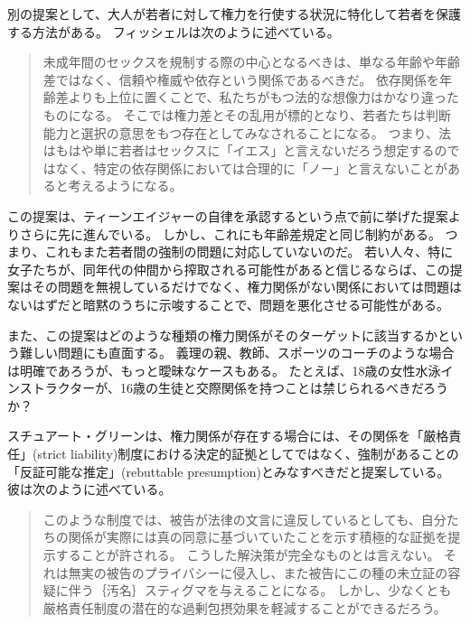 \documentclass[paper=a4,book,openany]{jlreq}
\newcommand{\ig}[1]{}           %
\begin{document}
別の提案として、大人が若者に対して権力を行使する状況に特化して若者を保護する方法がある。
フィッシェルは次のように述べている。

\begin{quote}
未成年間のセックスを規制する際の中心となるべきは、単なる年齢や年齢差ではなく、信頼や権威や依存という関係であるべきだ。
依存関係を年齢差よりも上位に置くことで、私たちがもつ法的な想像力はかなり違ったものになる。
そこでは権力差とその乱用が標的となり、若者たちは判断能力と選択の意思をもつ存在としてみなされることになる。
つまり、法はもはや単に若者はセックスに「イエス」と言えないだろう想定するのではなく、特定の依存関係においては合理的に「ノー」と言えないことがあると考えるようになる。
\citep[pp.315--316]{fischel10:_per_se_power}
\end{quote}

この提案は、ティーンエイジャーの自律を承認するという点で前に挙げた提案よりさらに先に進んでいる。
しかし、これにも年齢差規定と同じ制約がある。
つまり、これもまた若者間の強制の問題に対応していないのだ。
若い人々、特に女子たちが、同年代の仲間から搾取される可能性があると信じるならば、この提案はその問題を無視しているだけでなく、権力関係がない関係においては問題はないはずだと暗黙のうちに示唆することで、問題を悪化させる可能性がある。

また、この提案はどのような種類の権力関係がそのターゲットに該当するかという難しい問題にも直面する。
義理の親、教師、スポーツのコーチのような場合は明確であろうが、もっと曖昧なケースもある。
たとえば、18歳の女性水泳インストラクターが、16歳の生徒と交際関係を持つことは禁じられるべきだろうか？

スチュアート・グリーン\ig{Stuart Green}は、権力関係が存在する場合には、その関係を「厳格責任」(strict liability)制度における決定的証拠としてではなく、強制があることの「反証可能な推定」(rebuttable presumption)とみなすべきだと提案している。
彼は次のように述べている。

\begin{quote}
このような制度では、被告が法律の文言に違反しているとしても、自分たちの関係が実際には真の同意に基づいていたことを示す積極的な証拠を提示することが許される。
こうした解決策が完全なものとは言えない。
それは無実の被告のプライバシーに侵入し、また被告にこの種の未立証の容疑に伴う｛汚名｝{スティグマ}を与えることになる。
しかし、少なくとも厳格責任制度の潜在的な過剰包摂効果を軽減することができるだろう。
\citep{green17:_how_crimin_inces}
\end{quote}
\end{document}
